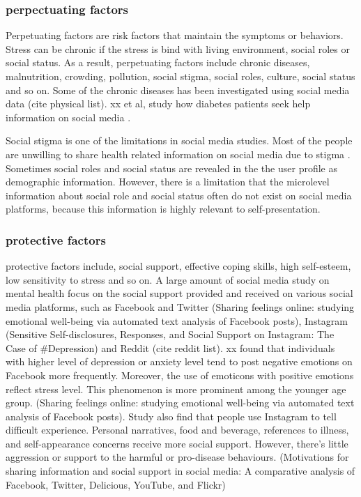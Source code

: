 \subsubsection{perpectuating factors}

Perpetuating factors are risk factors that maintain the symptoms or behaviors. Stress can be chronic if the stress is bind with living environment, social roles or social status. As a result, perpetuating factors include chronic diseases, malnutrition, crowding, pollution, social stigma, social roles, culture, social status and so on. Some of the chronic diseases has been investigated using social media data (cite physical list). xx et al, study how diabetes patients seek help information on social media \cite{shaw2011health}.

Social stigma is one of the limitations in social media studies. Most of the people are unwilling to share health related information on social media due to stigma \cite{moorhead2013new}. Sometimes social roles and social status are revealed in the the user profile as demographic information. However, there is a limitation that the microlevel information about social role and social status often do not exist on social media platforms, because this information is highly relevant to self-presentation.


\subsubsection{protective factors}

protective factors include, social support, effective coping skills, high self-esteem, low sensitivity to stress and so on. A large amount of social media study on mental health focus on the social support provided and received on various social media platforms, such as Facebook and Twitter (Sharing feelings online: studying emotional well-being via automated text analysis of Facebook posts), Instagram (Sensitive Self-disclosures, Responses, and Social Support on Instagram: The Case of #Depression) and Reddit (cite reddit list). xx found that individuals with higher level of depression or anxiety level tend to post negative emotions on Facebook more frequently. Moreover, the use of emoticons with positive emotions reflect stress level. This phenomenon is more prominent among the younger age group.
(Sharing feelings online: studying emotional well-being via automated text analysis of Facebook posts). Study also find that people use Instagram to tell difficult experience. Personal narratives, food and beverage, references to illness, and self-appearance concerns receive more social support. However, there's little aggression or support to the harmful or pro-disease behaviours. (Motivations for sharing information and social support in social media: A comparative analysis of Facebook, Twitter, Delicious, YouTube, and Flickr)


